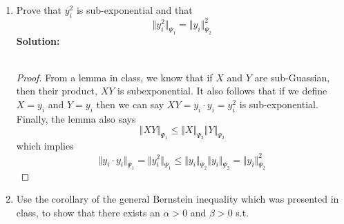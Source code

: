 \documentclass[11pt]{article}
\begin{document}
\begin{enumerate}
	\textbf{Solution:} \\
	\begin{proof}
	First we show $E[y_i]$. 
	\begin{align*}
		E[y_i] &= E \left[ \sum_{j=1}^{n} g_{i,j}x_j \right] = \sum_{j=1}^{n} E \left[ g_{i,j}x_j \right] \\
		&= \sum_{j=1}^{n} x_j E \left[ g_{i,j} \right] \\
		&= \sum_{j=1}^{n} x_j 0 &&\text{(since $g_{i,j}$ is sub-Guassian with mean $0$)} \\
		&= \sum_{j=1}^{n} 0 \\
		&= 0
	\end{align*}
	Now, we show $Var[y_i]$.
	\begin{align*}
		Var[y_i] &= E[y_i^2] - E^2[y_i] \\
		&= E[y_i^2] \\\
		&= E \left[\left(\underbrace{\sum_{j=1}^n g_{i,j}x_j}_{N \left(0, \sum_{j=1}^n x_j^2 \right)} \right)^2 \right] \\
		&= \sum_{j=1}^n x_j^2 &&\text{(since it is just Guassian, we can take the variance out)}\\
		&= \Vert x \Vert_2^2 
	\end{align*}
\end{proof}
	\item Prove that $y_i^2$ is sub-exponential and that
	\begin{equation*}
		\Vert y_i^2 \Vert_{\Psi_1} = \Vert y_i \Vert_{\Psi_2}^{2}
	\end{equation*}
	\textbf{Solution:} \\\\
	\begin{proof}
	From a lemma in class, we know that if $X$ and $Y$ are sub-Guassian, then their product, $XY$ is subexponential. It also follows that if we define $X = y_i$ and $Y = y_i$ then we can say $XY = y_i \cdot y_i = y_i^2$ is sub-exponential. Finally, the lemma also says
	\begin{equation*}
		\Vert XY \Vert_{\Psi_1} \le \Vert X \Vert_{\Psi_2} \Vert Y \Vert_{\Psi_2}
	\end{equation*}
	which implies
	\begin{equation*}
		\Vert y_i \cdot y_i \Vert_{\Psi_1} = \Vert y_i^2 \Vert_{\Psi_1} \le \Vert y_i \Vert_{\Psi_2} \Vert y_i \Vert_{\Psi_2} = \Vert y_i \Vert_{\Psi_2}^2
	\end{equation*}
\end{proof}	
	\item Use the corollary of the general Bernstein inequality which was presented in class, to show that there exists an $\alpha > 0$ and $\beta > 0$ s.t.

\end{enumerate}
\end{document}
